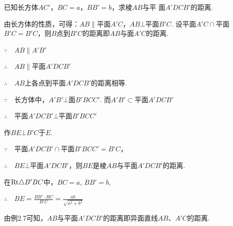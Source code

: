 \noindent
\begin{minipage}{.58\textwidth}
\begin{example}
    已知长方体$AC'$，$BC=a$，$BB'=b$，求棱$AB$与平
面$A'DCB'$的距离.
\end{example}

\begin{analyze}
由长方体的性质，可得：$AB\parallel $平面$A'C$，$AB\bot $平面$B'C$. 设平面$A'C\cap$平面$B'C=B'C$，则$B$点到$B'C$的距离即$AB$与面$A'C$的距离.
\end{analyze}

\end{minipage}
\hfill
\begin{minipage}{.4\textwidth}
\centering
{}
\end{minipage}

\begin{solution}
$\because\quad AB\parallel A'B'$

$\therefore\quad AB\parallel $平面$A'DCB'$

$\therefore\quad AB$上各点到平面$A'DCB'$的距离相等.

$\because\quad $长方体中，$A'B'\bot $面$B'BCC'$. 而$A'B'\subset $平面$A'DCB'$

$\therefore\quad $平面$A'DCB'\bot $平面$B'BCC'$

作$BE\bot B'C$于$E$. 

$\because\quad$平面$A'DCB'\cap $平面$B'BCC'=B'C$，

$\therefore\quad BE\bot $平面$A'DCB'$，则$BE$是棱$AB$与平面$A'DCB'$的距离.

在${\rm Rt}\triangle B'BC$中，$BC=a$, $BB'=b$,

$\therefore\quad BE=\frac{BB'\cdot BC}{B'C}=\frac{ab}{\sqrt{a^2+b^2}}$
\end{solution}

\begin{rmk}
    由例2.7可知，$AB$与平面$A'DCB'$的距离即异面直线$AB$、$A'C$的距离.
\end{rmk}



